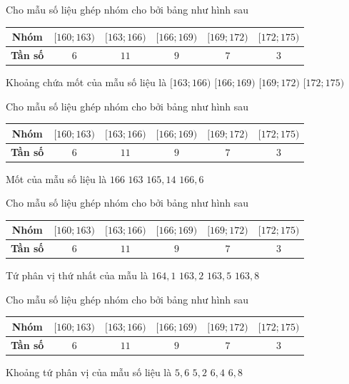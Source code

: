 \begin{ex}%
Cho mẫu số liệu ghép nhóm cho bởi bảng như hình sau
	\begin{center}
		\begin{tabular}{|c|c|c|c|c|c|}
			\hline
			\textbf{Nhóm} & $[160;163)$&$[163;166)$& $[166;169)$& $[169;172)$&$[172;175)$\\
			\hline
			\textbf{Tần số} & $6$ &$11$& $9$& $7$&$3$\\
			\hline
		\end{tabular}
	\end{center}
Khoảng chứa mốt của mẫu số liệu là
	\choice
	{$[163;166)$}
	{\True $[166;169)$}
	{$[169;172)$}
	{$[172;175)$}
	\loigiai{		
	}
\end{ex}
\begin{ex}%
Cho mẫu số liệu ghép nhóm cho bởi bảng như hình sau
\begin{center}
	\begin{tabular}{|c|c|c|c|c|c|}
		\hline
		\textbf{Nhóm} & $[160;163)$&$[163;166)$& $[166;169)$& $[169;172)$&$[172;175)$\\
		\hline
		\textbf{Tần số} & $6$ &$11$& $9$& $7$&$3$\\
		\hline
	\end{tabular}
\end{center}
Mốt của mẫu số liệu là
	\choice
	{$166$}
	{$163$}
	{\True $165{,}14$}
	{$166{,}6$}
\end{ex}
\begin{ex}%
Cho mẫu số liệu ghép nhóm cho bởi bảng như hình sau
\begin{center}
	\begin{tabular}{|c|c|c|c|c|c|}
		\hline
		\textbf{Nhóm} & $[160;163)$&$[163;166)$& $[166;169)$& $[169;172)$&$[172;175)$\\
		\hline
		\textbf{Tần số} & $6$ &$11$& $9$& $7$&$3$\\
		\hline
	\end{tabular}
\end{center}
Tứ phân vị thứ nhất của mẫu là
	\choice
	{$164{,}1$}
	{$163{,}2$}
	{$163{,}5$}
	{\True $163{,}8$}
\end{ex}
\begin{ex}%
	Cho mẫu số liệu ghép nhóm cho bởi bảng như hình sau
	\begin{center}
		\begin{tabular}{|c|c|c|c|c|c|}
			\hline
			\textbf{Nhóm} & $[160;163)$&$[163;166)$& $[166;169)$& $[169;172)$&$[172;175)$\\
			\hline
			\textbf{Tần số} & $6$ &$11$& $9$& $7$&$3$\\
			\hline
		\end{tabular}
	\end{center}
Khoảng tứ phân vị của mẫu số liệu là
	\choice
	{\True $5{,}6$}
	{$5{,}2$}
	{$6{,}4$}
	{$6{,}8$}
\end{ex}
